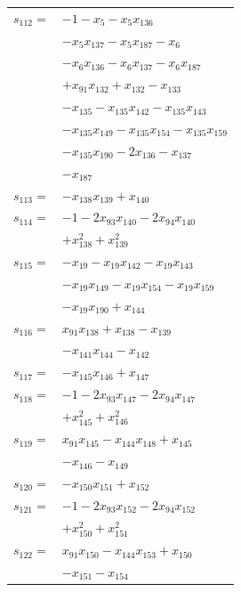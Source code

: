 \begin{longtable}{@{}r@{\;}l@{}}
\(s_{112}=\) & \(\displaystyle -1 -x_{5} -x_{5}x_{136}\) \\
 & \(\displaystyle -x_{5}x_{137} -x_{5}x_{187} -x_{6}\) \\
 & \(\displaystyle -x_{6}x_{136} -x_{6}x_{137} -x_{6}x_{187}\) \\
 & \(\displaystyle +x_{91}x_{132} +x_{132} -x_{133}\) \\
 & \(\displaystyle -x_{135} -x_{135}x_{142} -x_{135}x_{143}\) \\
 & \(\displaystyle -x_{135}x_{149} -x_{135}x_{154} -x_{135}x_{159}\) \\
 & \(\displaystyle -x_{135}x_{190} -2x_{136} -x_{137}\) \\
 & \(\displaystyle -x_{187}\) \\[3pt]
\(s_{113}=\) & \(\displaystyle -x_{138}x_{139} +x_{140}\) \\[3pt]
\(s_{114}=\) & \(\displaystyle -1 -2x_{93}x_{140} -2x_{94}x_{140}\) \\
 & \(\displaystyle +x_{138}^{2} +x_{139}^{2}\) \\[3pt]
\(s_{115}=\) & \(\displaystyle -x_{19} -x_{19}x_{142} -x_{19}x_{143}\) \\
 & \(\displaystyle -x_{19}x_{149} -x_{19}x_{154} -x_{19}x_{159}\) \\
 & \(\displaystyle -x_{19}x_{190} +x_{144}\) \\[3pt]
\(s_{116}=\) & \(\displaystyle x_{91}x_{138} +x_{138} -x_{139}\) \\
 & \(\displaystyle -x_{141}x_{144} -x_{142}\) \\[3pt]
\(s_{117}=\) & \(\displaystyle -x_{145}x_{146} +x_{147}\) \\[3pt]
\(s_{118}=\) & \(\displaystyle -1 -2x_{93}x_{147} -2x_{94}x_{147}\) \\
 & \(\displaystyle +x_{145}^{2} +x_{146}^{2}\) \\[3pt]
\(s_{119}=\) & \(\displaystyle x_{91}x_{145} -x_{144}x_{148} +x_{145}\) \\
 & \(\displaystyle -x_{146} -x_{149}\) \\[3pt]
\(s_{120}=\) & \(\displaystyle -x_{150}x_{151} +x_{152}\) \\[3pt]
\(s_{121}=\) & \(\displaystyle -1 -2x_{93}x_{152} -2x_{94}x_{152}\) \\
 & \(\displaystyle +x_{150}^{2} +x_{151}^{2}\) \\[3pt]
\(s_{122}=\) & \(\displaystyle x_{91}x_{150} -x_{144}x_{153} +x_{150}\) \\
 & \(\displaystyle -x_{151} -x_{154}\) \\[3pt]

\end{longtable}
